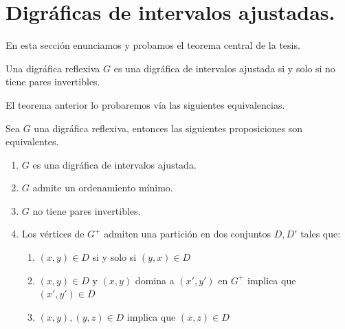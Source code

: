 \section{Digr\'aficas de intervalos ajustadas.}

En esta secci\'on enunciamos y probamos el teorema central de la tesis. 

\begin{teorema}
    Una digr\'afica reflexiva $G$ es una digr\'afica de intervalos ajustada si y
    solo si no tiene pares invertibles.
\end{teorema}

El teorema anterior lo probaremos vía las siguientes equivalencias.

 \begin{teorema}
     Sea $G$ una digr\'afica reflexiva, entonces las siguientes proposiciones
     son equivalentes.
\begin{enumerate}
  \item $G$ es una digr\'afica de intervalos ajustada.
  \item $G$ admite un ordenamiento mínimo.
  \item $G$ no tiene pares invertibles.
  \item Los v\'ertices de $G^+$ admiten una partici\'on en dos conjuntos $D, D'$
  tales que:
        \begin{enumerate}
            \item $(x,y)\in D $ si y solo si $ (y,x) \in D$
            \item $(x,y)\in D$ y $(x,y)$ domina a $(x',y')$ en $G^+$ implica que
            $(x',y')\in D$
            \item $(x,y), (y,z)\in D$ implica que $(x,z)\in D$
        \end{enumerate}
\end{enumerate}

\end{teorema}


